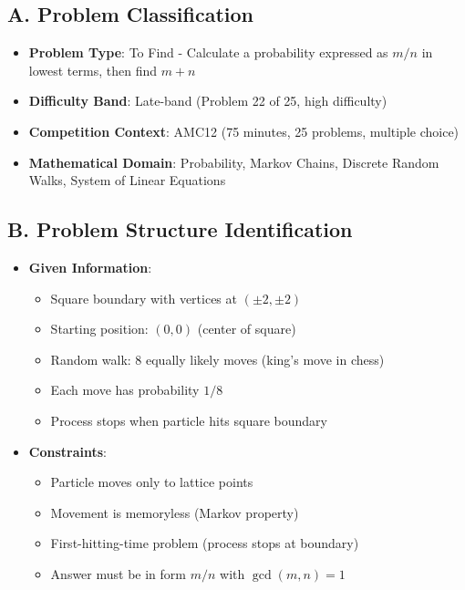 \documentclass[12pt]{article}
\begin{document}
\begin{problemconfigbox}

\subsection*{A. Problem Classification}
\begin{itemize}[leftmargin=*]
    \item \textbf{Problem Type}: To Find - Calculate a probability expressed as $m/n$ in lowest terms, then find $m+n$
    \item \textbf{Difficulty Band}: Late-band (Problem 22 of 25, high difficulty)
    \item \textbf{Competition Context}: AMC12 (75 minutes, 25 problems, multiple choice)
    \item \textbf{Mathematical Domain}: Probability, Markov Chains, Discrete Random Walks, System of Linear Equations
\end{itemize}

\subsection*{B. Problem Structure Identification}
\begin{itemize}[leftmargin=*]
    \item \textbf{Given Information}: 
    \begin{itemize}
        \item Square boundary with vertices at $(\pm 2, \pm 2)$
        \item Starting position: $(0,0)$ (center of square)
        \item Random walk: 8 equally likely moves (king's move in chess)
        \item Each move has probability $1/8$
        \item Process stops when particle hits square boundary
    \end{itemize}
    
    \item \textbf{Constraints}: 
    \begin{itemize}
        \item Particle moves only to lattice points
        \item Movement is memoryless (Markov property)
        \item First-hitting-time problem (process stops at boundary)
        \item Answer must be in form $m/n$ with $\gcd(m,n)=1$
    \end{itemize}
    

\end{itemize}
\end{problemconfigbox}
\end{document}
